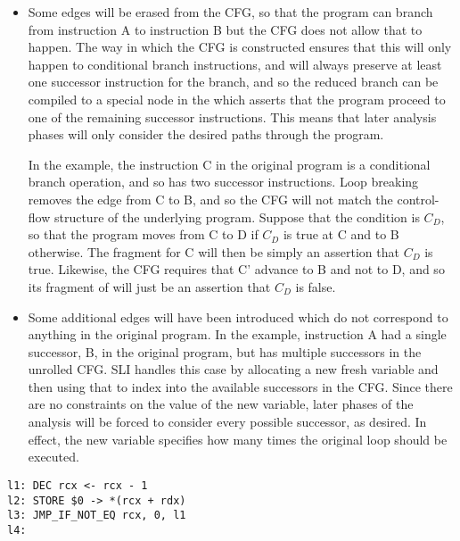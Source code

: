 \begin{itemize}
\item
  Some edges will be erased from the CFG, so that the program can branch from instruction A to instruction B but the CFG does not allow that to happen.
  The way in which the CFG is constructed ensures that this will only happen to conditional branch instructions, and will always preserve at least one successor instruction for the branch, and so the reduced branch can be compiled to a special  node in the \StateMachine which asserts that the program proceed to one of the remaining successor instructions.
  This means that later analysis phases will only consider the desired paths through the program.

  In the example, the instruction C in the original program is a conditional branch operation, and so has two successor instructions.
  Loop breaking removes the edge from C to B, and so the CFG will not match the control-flow structure of the underlying program.
  Suppose that the condition is $C_D$, so that the program moves from C to D if $C_D$ is true at C and to B otherwise.
  The \StateMachine fragment for C will then be simply an assertion that $C_D$ is true.
  Likewise, the CFG requires that C' advance to B and not to D, and so its fragment of \StateMachine will just be an assertion that $C_D$ is false.

\item
  Some additional edges will have been introduced which do not correspond to anything in the original program.
  In the example, instruction A had a single successor, B, in the original program, but has multiple successors in the unrolled CFG.
  SLI handles this case by allocating a new fresh variable and then using that to index into the available successors in the CFG.
  Since there are no constraints on the value of the new variable, later phases of the analysis will be forced to consider every possible successor, as desired.
  In effect, the new variable specifies how many times the original loop should be executed.
\end{itemize}



\begin{verbatim}
l1: DEC rcx <- rcx - 1
l2: STORE $0 -> *(rcx + rdx)
l3: JMP_IF_NOT_EQ rcx, 0, l1
l4:
\end{verbatim}


